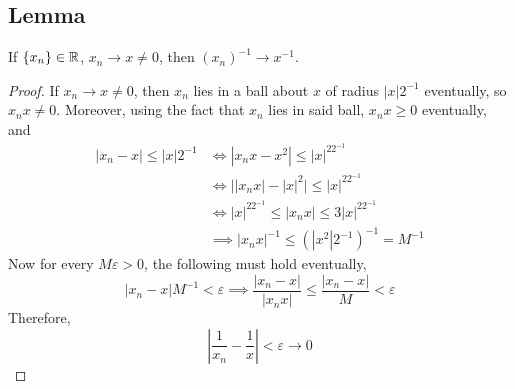 \documentclass[../../main.tex]{subfiles}
\begin{document}
\providecommand{\xn}{\{x_n\}}
\providecommand{\yn}{\{y_n\}}
\subsection{Lemma}
\begin{lemma}\label{lemma:sequence converges to inverse}
    If $\xn\in\real$, $x_n\to x\neq 0$, then $(x_n)^{-1}\to x^{-1}$.
\end{lemma}
\begin{proof}
    If $x_n\to x\neq 0$, then $x_n$ lies in a ball about $x$ of radius $|x|2^{-1}$ eventually, so $x_nx\neq 0$. Moreover, using the fact that $x_n$ lies in said ball, $x_nx\geq 0$ eventually, and
    \begin{align*}
        |x_n-x|\leq |x|2^{-1}&\iff |x_nx - x^2|\leq |x|^22^{-1}\\[1ex]
        &\iff \biggl||x_nx|-|x|^2\biggr|\leq |x|^22^{-1}\\[1ex]
        &\iff |x|^22^{-1}\leq |x_nx|\leq 3|x|^22^{-1}\\[1ex]
        &\implies |x_nx|^{-1}\leq (|x^2|2^{-1})^{-1}=M^{-1}
    \end{align*}
    Now for every $M\varepsilon> 0$, the following must hold eventually,
    \[
    |x_n-x|M^{-1}<\varepsilon \implies \dfrac{|x_n-x|}{|x_nx|}\leq \dfrac{|x_n-x|}{M}<\varepsilon
    \]
    Therefore,
    \[
    \left|\dfrac{1}{x_n}-\dfrac{1}{x}\right|<\varepsilon\to 0
    \]
\end{proof}
\end{document}
